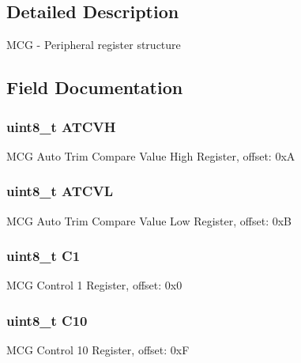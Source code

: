 \subsection{Detailed Description}
M\+C\+G -\/ Peripheral register structure 

\subsection{Field Documentation}
\hypertarget{struct_m_c_g___mem_map_a7ae9332fda80dd2a8e8f6bbe7402f04e}{}
\subsubsection[{A\+T\+C\+V\+H}]{\setlength{\rightskip}{0pt plus 5cm}uint8\+\_\+t A\+T\+C\+V\+H}\label{struct_m_c_g___mem_map_a7ae9332fda80dd2a8e8f6bbe7402f04e}
M\+C\+G Auto Trim Compare Value High Register, offset\+: 0x\+A \hypertarget{struct_m_c_g___mem_map_ae14380e7296a15f9cad9168b69189eff}{}
\subsubsection[{A\+T\+C\+V\+L}]{\setlength{\rightskip}{0pt plus 5cm}uint8\+\_\+t A\+T\+C\+V\+L}\label{struct_m_c_g___mem_map_ae14380e7296a15f9cad9168b69189eff}
M\+C\+G Auto Trim Compare Value Low Register, offset\+: 0x\+B \hypertarget{struct_m_c_g___mem_map_a8286c9d870f31a089d95e6a2285fbe2f}{}
\subsubsection[{C1}]{\setlength{\rightskip}{0pt plus 5cm}uint8\+\_\+t C1}\label{struct_m_c_g___mem_map_a8286c9d870f31a089d95e6a2285fbe2f}
M\+C\+G Control 1 Register, offset\+: 0x0 \hypertarget{struct_m_c_g___mem_map_aeaf517a97bec32fa35a10e97fdff08be}{}
\subsubsection[{C10}]{\setlength{\rightskip}{0pt plus 5cm}uint8\+\_\+t C10}\label{struct_m_c_g___mem_map_aeaf517a97bec32fa35a10e97fdff08be}
M\+C\+G Control 10 Register, offset\+: 0x\+F \hypertarget{struct_m_c_g___mem_map_acdf8ac8ab339152eaed13f4eca300aa5}{}
